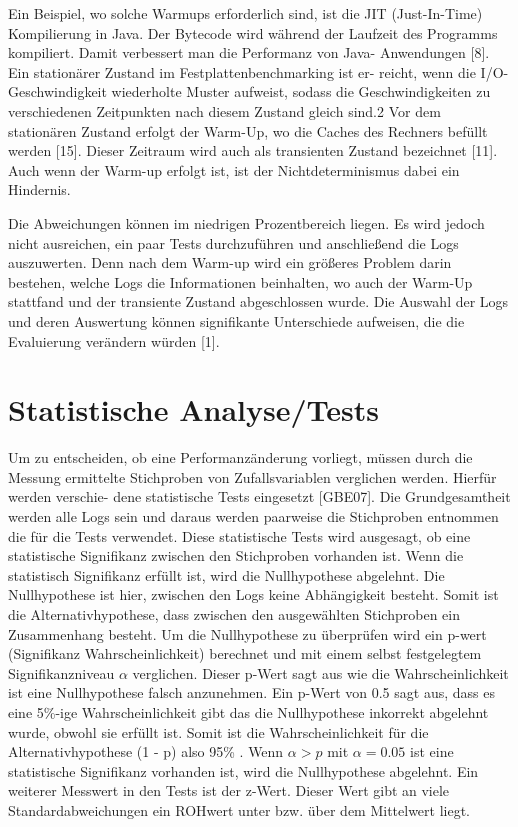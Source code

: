  Ein Beispiel, wo solche Warmups erforderlich sind, ist die JIT
(Just-In-Time) Kompilierung in Java. Der Bytecode wird während der Laufzeit
des Programms kompiliert. Damit verbessert man die Performanz von Java-
Anwendungen [8]. Ein stationärer Zustand im Festplattenbenchmarking ist er-
reicht, wenn die I/O-Geschwindigkeit wiederholte Muster aufweist, sodass die
Geschwindigkeiten zu verschiedenen Zeitpunkten nach diesem Zustand gleich
sind.2 Vor dem stationären Zustand erfolgt der Warm-Up, wo die Caches des
Rechners befüllt werden [15]. Dieser Zeitraum wird auch als transienten Zustand
bezeichnet [11]. Auch wenn der Warm-up erfolgt ist, ist der Nichtdeterminismus
dabei ein Hindernis.

Die Abweichungen können im niedrigen Prozentbereich liegen. Es wird jedoch nicht
ausreichen, ein paar Tests durchzuführen und anschließend die Logs auszuwerten. 
Denn nach dem Warm-up wird ein größeres Problem darin bestehen,
welche Logs die Informationen beinhalten, wo auch der Warm-Up stattfand und
der transiente Zustand abgeschlossen wurde. Die Auswahl der Logs und deren
Auswertung können signifikante Unterschiede aufweisen, die die Evaluierung
verändern würden [1].



\section{Statistische Analyse/Tests}
Um zu entscheiden, ob eine Performanzänderung vorliegt, müssen durch die Messung
ermittelte Stichproben von Zufallsvariablen verglichen werden. Hierfür werden verschie-
dene statistische Tests eingesetzt [GBE07]. 
Die Grundgesamtheit werden alle Logs sein und daraus werden paarweise die Stichproben entnommen die für die Tests verwendet.
Diese statistische Tests wird ausgesagt, ob eine statistische Signifikanz zwischen den Stichproben vorhanden ist.
Wenn die statistisch Signifikanz erfüllt ist, wird die Nullhypothese abgelehnt.
Die Nullhypothese ist hier, zwischen den Logs keine Abhängigkeit besteht.
Somit ist die Alternativhypothese, dass zwischen den ausgewählten Stichproben ein Zusammenhang besteht.
Um die Nullhypothese zu überprüfen wird ein p-wert (Signifikanz Wahrscheinlichkeit) berechnet und mit einem selbst
festgelegtem Signifikanzniveau $\alpha$ verglichen.
Dieser p-Wert sagt aus wie die Wahrscheinlichkeit ist eine Nullhypothese falsch anzunehmen. 
Ein p-Wert von 0.5 sagt aus, dass es eine 5\%-ige Wahrscheinlichkeit gibt das die Nullhypothese inkorrekt abgelehnt wurde, obwohl sie erfüllt ist.
Somit ist die Wahrscheinlichkeit für die Alternativhypothese (1 - p) also 95\% \cite{statistics}.
Wenn $\alpha > p$ mit $\alpha = 0.05$ ist eine statistische Signifikanz vorhanden ist, wird die Nullhypothese abgelehnt. 
Ein weiterer Messwert in den Tests ist der z-Wert. Dieser Wert gibt an viele Standardabweichungen ein ROHwert unter
bzw. über dem Mittelwert liegt.


